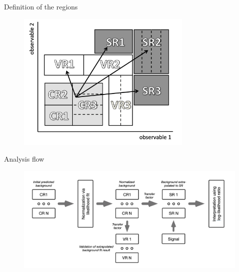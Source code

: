 \documentclass{beamer}
\begin{document}
\begin{frame}{Definition of the regions}
\begin{figure}
\includegraphics[width=0.75\textwidth]{regions}
\end{figure}
\end{frame}

\begin{frame}{Analysis flow}
\begin{figure}
\includegraphics[width=1.\textwidth]{regions2}
\end{figure}
\end{frame}
\end{document}
